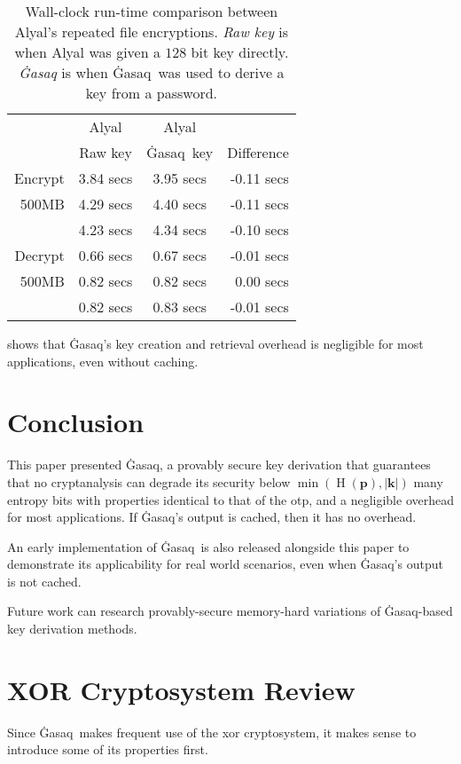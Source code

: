 \documentclass[twocolumn,hidelinks]{article}
\newcommand{\ghasaq}{Ġasaq}
\DeclareMathOperator{\entropy}{H}
\begin{document}
\begin{table}[tbh]
    \centering
    \begin{tabular}{rccr}
                & Alyal     & Alyal        & \\
                & Raw key   & \ghasaq\ key & Difference\\\hline
        Encrypt & 3.84 secs & 3.95 secs    & -0.11 secs\\
        500MB   & 4.29 secs & 4.40 secs    & -0.11 secs\\
                & 4.23 secs & 4.34 secs    & -0.10 secs\\\hline
        Decrypt & 0.66 secs & 0.67 secs    & -0.01 secs\\
        500MB   & 0.82 secs & 0.82 secs    &  0.00 secs\\
                & 0.82 secs & 0.83 secs    & -0.01 secs\\
    \end{tabular}
    \caption{Wall-clock run-time comparison between Alyal's repeated file
    encryptions.  \emph{Raw key} is when Alyal was given a $128$ bit key
    directly.  \emph{\ghasaq} is when \ghasaq\ was used to derive a key
    from a password.} \label{tbl_benchmark}
\end{table}

 shows that \ghasaq's key creation and retrieval
overhead is negligible for most applications, even without caching.

\section{Conclusion}
This paper presented \ghasaq, a provably secure key derivation that
guarantees that no cryptanalysis can degrade its security below
$\min(\entropy(\mathbf{p}), |\mathbf{k}|)$ many entropy bits with
properties identical to that of the \gls{otp}, and a negligible overhead
for most applications.  If \ghasaq's output is cached, then it has no
overhead.

An early implementation of \ghasaq\ is also released alongside this paper
to demonstrate its applicability for real world scenarios, even when
\ghasaq's output is not cached.

Future work can research provably-secure memory-hard variations of
\ghasaq-based key derivation methods.




\vfill
\break
\appendix
\section{XOR Cryptosystem Review}\label{sec_xor_cryptosystem_review}
Since \ghasaq\ makes frequent use of the \gls{xor} cryptosystem, it makes
sense to introduce some of its properties first.
\end{document}

